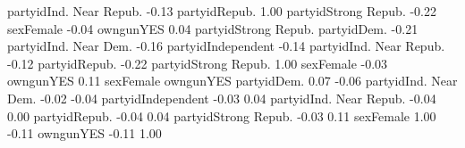 \begin{Schunk}
\begin{Soutput}
partyidInd. Near Repub.         -0.13
partyidRepub.                    1.00
partyidStrong Repub.            -0.22
sexFemale                       -0.04
owngunYES                        0.04
                        partyidStrong Repub.
partyidDem.                            -0.21
partyidInd. Near Dem.                  -0.16
partyidIndependent                     -0.14
partyidInd. Near Repub.                -0.12
partyidRepub.                          -0.22
partyidStrong Repub.                    1.00
sexFemale                              -0.03
owngunYES                               0.11
                        sexFemale owngunYES
partyidDem.                  0.07     -0.06
partyidInd. Near Dem.       -0.02     -0.04
partyidIndependent          -0.03      0.04
partyidInd. Near Repub.     -0.04      0.00
partyidRepub.               -0.04      0.04
partyidStrong Repub.        -0.03      0.11
sexFemale                    1.00     -0.11
owngunYES                   -0.11      1.00
\end{Soutput}
\end{Schunk}
